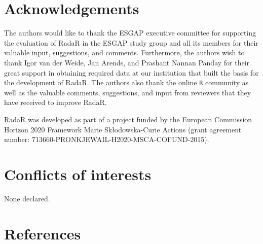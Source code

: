 \documentclass[
]{book}
\begin{document}
\hypertarget{acknowledgements-1}{%
\section*{Acknowledgements}\label{acknowledgements-1}}

The authors would like to thank the ESGAP executive committee for supporting the evaluation of RadaR in the ESGAP study group and all its members for their valuable input, suggestions, and comments. Furthermore, the authors wish to thank Igor van der Weide, Jan Arends, and Prashant Nannan Panday for their great support in obtaining required data at our institution that built the basis for the development of RadaR. The authors also thank the online \texttt{R} community as well as the valuable comments, suggestions, and input from reviewers that they have received to improve RadaR.

RadaR was developed as part of a project funded by the European Commission Horizon 2020 Framework Marie Skłodowska-Curie Actions (grant agreement number: 713660-PRONKJEWAIL-H2020-MSCA-COFUND-2015).

\hypertarget{conflicts-of-interests}{%
\section*{Conflicts of interests}\label{conflicts-of-interests}}

None declared.

\hypertarget{references-4}{%
\section*{References}\label{references-4}}
\end{document}
